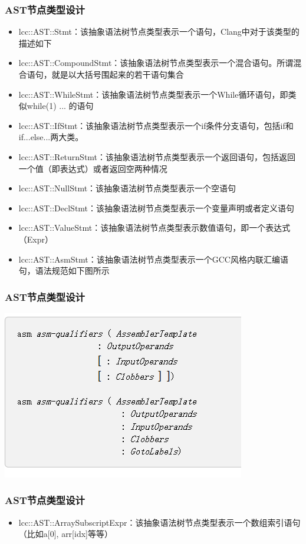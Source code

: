 \begin{frame}
    \frametitle{AST节点类型设计}
    \footnotesize
    \begin{itemize}
        \item {lcc::AST::Stmt：该抽象语法树节点类型表示一个语句，Clang中对于该类型的描述如下}
        \item {lcc::AST::CompoundStmt：该抽象语法树节点类型表示一个混合语句。所谓混合语句，就是以大括号围起来的若干语句集合}
        \item {lcc::AST::WhileStmt：该抽象语法树节点类型表示一个While循环语句，即类似while(1){ ... }的语句}
        \item {lcc::AST::IfStmt：该抽象语法树节点类型表示一个if条件分支语句，包括if和if...else...两大类。}
        \item {lcc::AST::ReturnStmt：该抽象语法树节点类型表示一个返回语句，包括返回一个值（即表达式）或者返回空两种情况}
        \item {lcc::AST::NullStmt：该抽象语法树节点类型表示一个空语句}
        \item {lcc::AST::DeclStmt：该抽象语法树节点类型表示一个变量声明或者定义语句}
        \item {lcc::AST::ValueStmt：该抽象语法树节点类型表示数值语句，即一个表达式（Expr）}
        \item {lcc::AST::AsmStmt：该抽象语法树节点类型表示一个GCC风格内联汇编语句，语法规范如下图所示}
    \end{itemize}
\end{frame}

\begin{frame}
    \frametitle{AST节点类型设计}
    \footnotesize
    \includegraphics[width=\textwidth]{contents/figure/asm.png}
\end{frame}

\begin{frame}
    \frametitle{AST节点类型设计}
    \footnotesize
    \begin{itemize}
        \item {lcc::AST::ArraySubscriptExpr：该抽象语法树节点类型表示一个数组索引语句（比如a[0], arr[idx]等等）}
    \end{itemize}
\end{frame}
